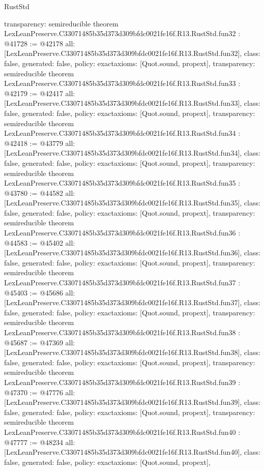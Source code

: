 \begin{lexlean}{RustStd}
\begin{coremodule}
{  transparency: semireducible
}
theorem LexLeanPreserve.C33071485b35d373d309bfdc0021fe16f.R13.RustStd.fun32 : @41728 := @42178 {
  all: [LexLeanPreserve.C33071485b35d373d309bfdc0021fe16f.R13.RustStd.fun32],
  class: false,
  generated: false,
  policy: exact{axioms: [Quot.sound, propext]},
  transparency: semireducible
}
theorem LexLeanPreserve.C33071485b35d373d309bfdc0021fe16f.R13.RustStd.fun33 : @42179 := @42417 {
  all: [LexLeanPreserve.C33071485b35d373d309bfdc0021fe16f.R13.RustStd.fun33],
  class: false,
  generated: false,
  policy: exact{axioms: [Quot.sound, propext]},
  transparency: semireducible
}
theorem LexLeanPreserve.C33071485b35d373d309bfdc0021fe16f.R13.RustStd.fun34 : @42418 := @43779 {
  all: [LexLeanPreserve.C33071485b35d373d309bfdc0021fe16f.R13.RustStd.fun34],
  class: false,
  generated: false,
  policy: exact{axioms: [Quot.sound, propext]},
  transparency: semireducible
}
theorem LexLeanPreserve.C33071485b35d373d309bfdc0021fe16f.R13.RustStd.fun35 : @43780 := @44582 {
  all: [LexLeanPreserve.C33071485b35d373d309bfdc0021fe16f.R13.RustStd.fun35],
  class: false,
  generated: false,
  policy: exact{axioms: [Quot.sound, propext]},
  transparency: semireducible
}
theorem LexLeanPreserve.C33071485b35d373d309bfdc0021fe16f.R13.RustStd.fun36 : @44583 := @45402 {
  all: [LexLeanPreserve.C33071485b35d373d309bfdc0021fe16f.R13.RustStd.fun36],
  class: false,
  generated: false,
  policy: exact{axioms: [Quot.sound, propext]},
  transparency: semireducible
}
theorem LexLeanPreserve.C33071485b35d373d309bfdc0021fe16f.R13.RustStd.fun37 : @45403 := @45686 {
  all: [LexLeanPreserve.C33071485b35d373d309bfdc0021fe16f.R13.RustStd.fun37],
  class: false,
  generated: false,
  policy: exact{axioms: [Quot.sound, propext]},
  transparency: semireducible
}
theorem LexLeanPreserve.C33071485b35d373d309bfdc0021fe16f.R13.RustStd.fun38 : @45687 := @47369 {
  all: [LexLeanPreserve.C33071485b35d373d309bfdc0021fe16f.R13.RustStd.fun38],
  class: false,
  generated: false,
  policy: exact{axioms: [Quot.sound, propext]},
  transparency: semireducible
}
theorem LexLeanPreserve.C33071485b35d373d309bfdc0021fe16f.R13.RustStd.fun39 : @47370 := @47776 {
  all: [LexLeanPreserve.C33071485b35d373d309bfdc0021fe16f.R13.RustStd.fun39],
  class: false,
  generated: false,
  policy: exact{axioms: [Quot.sound, propext]},
  transparency: semireducible
}
theorem LexLeanPreserve.C33071485b35d373d309bfdc0021fe16f.R13.RustStd.fun40 : @47777 := @48234 {
  all: [LexLeanPreserve.C33071485b35d373d309bfdc0021fe16f.R13.RustStd.fun40],
  class: false,
  generated: false,
  policy: exact{axioms: [Quot.sound, propext]},
}
\end{coremodule}
\end{lexlean}
